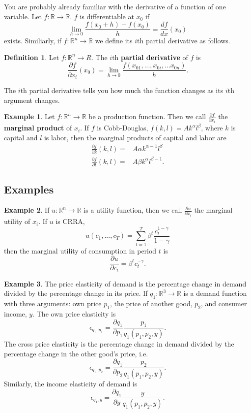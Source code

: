 \documentclass[12pt,reqno]{amsart}
\theoremstyle{definition}
\newtheorem{definition}{Definition}[section]
\newtheorem{example}{Example}[section]
\def\R{\mathbb{R}}
\renewcommand{\to}{{\rightarrow}}
\begin{document}
You are probably already familiar with the derivative of a function of
one variable. Let $f: \R \to \R$. $f$ is differentiable at $x_0$ if 
\[ \lim_{h \to 0} \frac{f(x_0 + h) - f(x_0)}{h} = \frac{d
  f}{dx}(x_0) \]
exists. Similiarly, if $f: \R^n \to \R$ we define its $i$th partial
derivative as follows.
\begin{definition}
  Let $f:\R^n \to R$. The $i$th \textbf{partial derivative} of $f$ is 
  \[ \frac{\partial f}{\partial x_i} (x_0) = \lim_{h \to 0}
  \frac{f(x_{01},...,x_{0i}, ... x_{0n})}{h}. \]
\end{definition}
The $i$th partial derivative tells you how much the function changes
as its $i$th argument changes.
\begin{example}
  Let $f:\R^n \to \R$ be a production function. Then we call
  $\frac{\partial f}{\partial x_i}$ the \textbf{marginal product} of
  $x_i$. If $f$ is Cobb-Douglas, $f(k,l) = Ak^\alpha l^\beta$, where
  $k$ is capital and $l$ is labor, then the marginal products of
  capital and labor are
  \begin{align*}
    \frac{\partial f}{\partial k} (k,l) = & A \alpha k^{\alpha-1}
    l^\beta \\
    \frac{\partial f}{\partial l} (k,l) = & A \beta k^{\alpha}
    l^{\beta -1}.
  \end{align*}
\end{example}

\subsection{Examples}
\begin{example}
  If $u:\R^n \to \R$ is a utility function, then we call
  $\frac{\partial u}{\partial x_i}$ the marginal utility of $x_i$.  
  If $u$ is CRRA, 
  \[u(c_1,...,c_T) =
  \sum_{t=1}^T \beta^t \frac{c_t^{1-\gamma}}{1-\gamma} \]
  then  the marginal utility of consumption in period $t$ is 
  \[ \frac{\partial u}{\partial c_t} = \beta^t c_t^{-\gamma}. \]
\end{example}

\begin{example}
  The price elasticity of demand is the percentage change in demand
  divided by the percentage change in its price. If $q_1:\R^3 \to \R$ is
  a demand function with three arguments: own price $p_1$, the price
  of another good, $p_2$, and consumer income, $y$.  The own price
  elasticity is 
  \[ \epsilon_{q_1,p_1} = \frac{\partial q_1}{\partial p_1}
  \frac{p_1}{q_1(p_1,p_2,y)}. \]
  The cross price elasticity is the percentage change in demand
  divided by the percentage change in the other good's price, i.e.
  \[ \epsilon_{q_1,p_2} = \frac{\partial q_1}{\partial p_2}
  \frac{p_2}{q_1(p_1,p_2,y)}. \]
  Similarly, the income elasticity of demand is
  \[ \epsilon_{q_1,y} = \frac{\partial q_1}{\partial y}
  \frac{y}{q_1(p_1,p_2,y)}. \]
\end{example}
\end{document}
